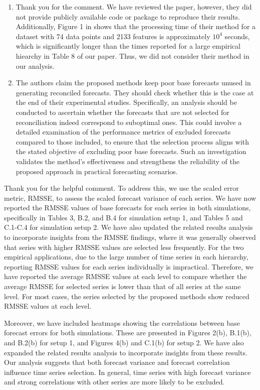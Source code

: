 \documentclass[11pt,a4paper,]{article}
\renewenvironment{quote}
               {\list{}{\rightmargin\leftmargin}%
                \item\relax\color[RGB]{0,150,0}}
               {\endlist}
\begin{document}
\begin{enumerate}
  \begin{quote}
  Thank you for the comment. We have reviewed the paper, however, they
  did not provide publicly available code or package to reproduce their
  results. Additionally, Figure 1 in \textcite{Ida2019-fa} shows that
  the processing time of their method for a dataset with 74 data points
  and 2133 features is approximately \(10^4\) seconds, which is
  significantly longer than the times reported for a large empirical
  hiearchy in Table 8 of our paper. Thus, we did not consider their
  method in our analysis.
  \end{quote}
\item
  The authors claim the proposed methods keep poor base forecasts unused
  in generating reconciled forecasts. They should check whether this is
  the case at the end of their experimental studies. Specifically, an
  analysis should be conducted to ascertain whether the forecasts that
  are not selected for reconciliation indeed correspond to suboptimal
  ones. This could involve a detailed examination of the performance
  metrics of excluded forecasts compared to those included, to ensure
  that the selection process aligns with the stated objective of
  excluding poor base forecasts. Such an investigation validates the
  method's effectiveness and strengthens the reliability of the proposed
  approach in practical forecasting scenarios.
\end{enumerate}

\begin{quote}
Thank you for the helpful comment. To address this, we use the scaled
error metric, RMSSE, to assess the scaled forecast variance of each
series. We have now reported the RMSSE values of base forecasts for each
series in both simulations, specifically in Tables 3, B.2, and B.4 for
simulation setup 1, and Tables 5 and C.1-C.4 for simulation setup 2. We
have also updated the related results analysis to incorporate insights
from the RMSSE findings, where it was generally observed that series
with higher RMSSE values are selected less frequently. For the two
empirical applications, due to the large number of time series in each
hierarchy, reporting RMSSE values for each series individually is
impractical. Therefore, we have reported the average RMSSE values at
each level to compare whether the average RMSSE for selected series is
lower than that of all series at the same level. For most cases, the
series selected by the proposed methods show reduced RMSSE values at
each level.

Moreover, we have included heatmaps showing the correlations between
base forecast errors for both simulations. These are presented in
Figures 2(b), B.1(b), and B.2(b) for setup 1, and Figures 4(b) and
C.1(b) for setup 2. We have also expanded the related results analysis
to incorporate insights from these results. Our analysis suggests that
both forecast variance and forecast correlation influence time series
selection. In general, time series with high forecast variance and
strong correlations with other series are more likely to be excluded.
\end{quote}
\end{document}
